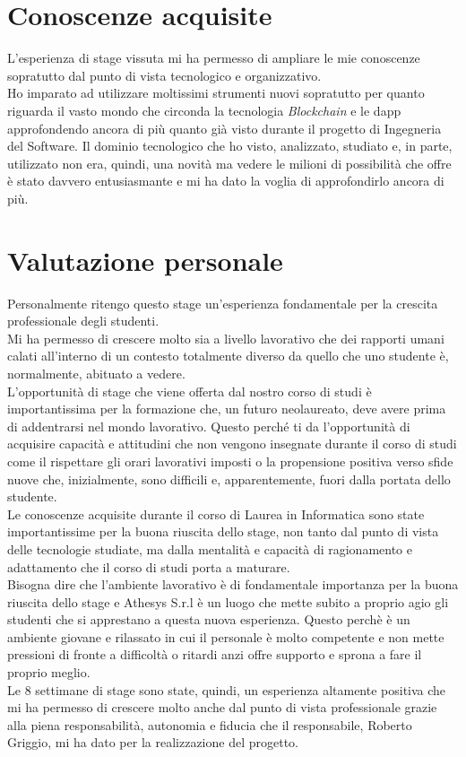 \section{Conoscenze acquisite}
L'esperienza di stage vissuta mi ha permesso di ampliare le mie conoscenze sopratutto dal punto di vista tecnologico e organizzativo.\\
Ho imparato ad utilizzare moltissimi strumenti nuovi sopratutto per quanto riguarda il vasto mondo che circonda la tecnologia \textit{Blockchain} e le \gls{dapp} approfondendo ancora di più quanto già visto durante il progetto di Ingegneria del Software. Il dominio tecnologico che ho visto, analizzato, studiato e, in parte, utilizzato non era, quindi, una novità ma vedere le milioni di possibilità che offre è stato davvero entusiasmante e mi ha dato la voglia di approfondirlo ancora di più.
\section{Valutazione personale}
Personalmente ritengo questo stage un'esperienza fondamentale per la crescita professionale degli studenti.\\
Mi ha permesso di crescere molto sia a livello lavorativo che dei rapporti umani calati all'interno di un contesto totalmente diverso da quello che uno studente è, normalmente, abituato a vedere.\\
L'opportunità di stage che viene offerta dal nostro corso di studi è importantissima per la formazione che, un futuro neolaureato, deve avere prima di addentrarsi nel mondo lavorativo. Questo perché ti da l'opportunità di acquisire capacità e attitudini che non vengono insegnate durante il corso di studi come il rispettare gli orari lavorativi imposti o la propensione positiva verso sfide nuove che, inizialmente, sono difficili e, apparentemente, fuori dalla portata dello studente.\\
Le conoscenze acquisite durante il corso di Laurea in Informatica sono state importantissime per la buona riuscita dello stage, non tanto dal punto di vista delle tecnologie studiate, ma dalla mentalità e capacità di ragionamento e adattamento che il corso di studi porta a maturare.\\
Bisogna dire che l'ambiente lavorativo è di fondamentale importanza per la buona riuscita dello stage e Athesys S.r.l è un luogo che mette subito a proprio agio gli studenti che si apprestano a questa nuova esperienza. Questo perchè è un ambiente giovane e rilassato in cui il personale è molto competente e non mette pressioni di fronte a difficoltà o ritardi anzi offre supporto e sprona a fare il proprio meglio.\\
Le 8 settimane di stage sono state, quindi, un esperienza altamente positiva che mi ha permesso di crescere molto anche dal punto di vista professionale grazie alla piena responsabilità, autonomia e fiducia che il responsabile, Roberto Griggio, mi ha dato per la realizzazione del progetto.